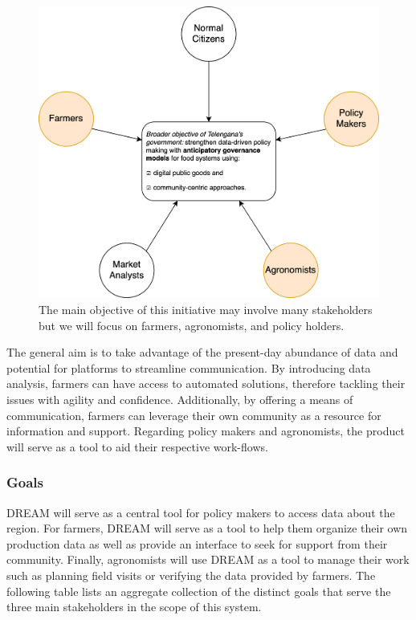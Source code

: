 \begin{flushleft}
\begin{figure}
\centering
\includegraphics[scale=0.6]{../images_diagrams/stakeholders_in_broader_gov_objective.png}
\caption{The main objective of this initiative may involve many stakeholders but we will focus on farmers, agronomists, and policy holders.}\label{fig:addOne{figure_counter}}
\end{figure}


The general aim is to take advantage of the present-day abundance of data and potential for platforms to streamline communication. By introducing data analysis, farmers can have access to automated solutions, therefore tackling their issues with agility and confidence. Additionally, by offering a means of communication, farmers can leverage their own community as a resource for information and support. Regarding policy makers and agronomists, the product will serve as a tool to aid their respective work-flows. 
\end{flushleft}

\subsubsection{Goals}

DREAM will serve as a central tool for policy makers to access data about the region. For farmers, DREAM will serve as a tool to help them organize their own production data as well as provide an interface to seek for support from their community. Finally, agronomists will use DREAM as a tool to manage their work such as planning field visits or verifying the data provided by farmers. The following table lists an aggregate collection of the distinct goals that serve the three main stakeholders in the scope of this system.


